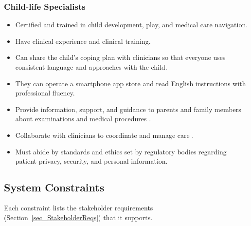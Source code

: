 \documentclass[10pt]{article}
\begin{document}
\subsubsection*{\textbf{Child-life Specialists}}
\begin{itemize}
    \item Certified and trained in child development, play, and medical care navigation.
    \item Have clinical experience and clinical training.
    \item Can share the child's coping plan with clinicians so that everyone uses
    consistent language and approaches with the child.
    \item They can operate a smartphone app store and read English instructions with 
    professional fluency.
    \item Provide information, support, and guidance to parents and family members about 
    examinations and medical procedures \cite{mayoChildLifeSpecialist}.
    \item Collaborate with clinicians to coordinate and manage care \cite{mayoChildLifeSpecialist}.
    \item Must abide by standards and ethics set by regulatory bodies regarding patient privacy, 
    security, and personal information.
\end{itemize}

\subsection{System Constraints}
\label{sec_Systen_Constraints}

Each constraint lists the stakeholder requirements
(Section~\ref{sec_StakeholderReqs}) that it supports.
\end{document}
